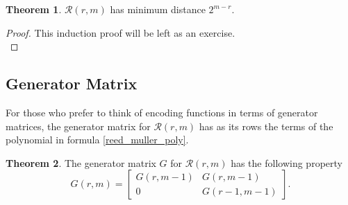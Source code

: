 \documentclass[12pt,twoside]{reedthesis}
\theoremstyle{definition}
\newtheorem{theorem}{Theorem}[chapter]
\begin{document}
\begin{theorem} 
$\mathscr{R}(r,m)$ has minimum distance $2^{m-r}$.
\end{theorem}
\begin{proof}
This induction proof will be left as an exercise.\\
\end{proof}
\subsection{Generator Matrix}
For those who prefer to think of encoding functions in terms of generator matrices, the generator matrix for $\mathscr{R}(r,m)$ has as its rows the terms of the polynomial in formula \ref{reed_muller_poly}.

\begin{theorem} The generator matrix $G$ for $\mathscr{R}(r,m)$ has the following property
\begin{equation*}
G(r, m) = 
\begin{bmatrix}
G(r, m-1) & G(r, m-1) \\
0 & G(r-1,m-1)
\end{bmatrix} .
\end{equation*}
\end{theorem}
\end{document}
